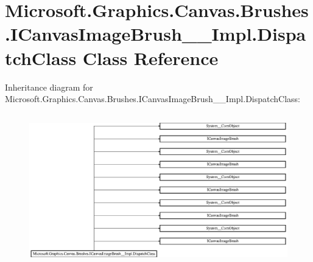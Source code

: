 \hypertarget{class_microsoft_1_1_graphics_1_1_canvas_1_1_brushes_1_1_i_canvas_image_brush_____impl_1_1_dispatch_class}{}\section{Microsoft.\+Graphics.\+Canvas.\+Brushes.\+I\+Canvas\+Image\+Brush\+\_\+\+\_\+\+Impl.\+Dispatch\+Class Class Reference}
\label{class_microsoft_1_1_graphics_1_1_canvas_1_1_brushes_1_1_i_canvas_image_brush_____impl_1_1_dispatch_class}
Inheritance diagram for Microsoft.\+Graphics.\+Canvas.\+Brushes.\+I\+Canvas\+Image\+Brush\+\_\+\+\_\+\+Impl.\+Dispatch\+Class\+:\begin{figure}[H]
\begin{center}
\leavevmode
\includegraphics[height=6.681128cm]{class_microsoft_1_1_graphics_1_1_canvas_1_1_brushes_1_1_i_canvas_image_brush_____impl_1_1_dispatch_class}
\end{center}
\end{figure}
